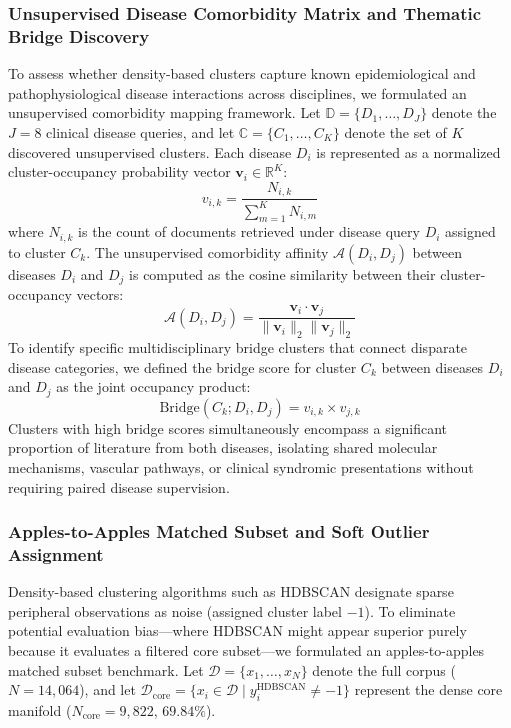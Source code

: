 \documentclass[a4paper,fleqn]{cas-dc}
\begin{document}
\subsubsection{Unsupervised Disease Comorbidity Matrix and Thematic Bridge Discovery}

To assess whether density-based clusters capture known epidemiological and pathophysiological disease interactions across disciplines, we formulated an unsupervised comorbidity mapping framework. Let $\mathbb{D} = \{D_1, \dots, D_J\}$ denote the $J=8$ clinical disease queries, and let $\mathbb{C} = \{C_1, \dots, C_K\}$ denote the set of $K$ discovered unsupervised clusters. Each disease $D_i$ is represented as a normalized cluster-occupancy probability vector $\mathbf{v}_i \in \mathbb{R}^K$:
\begin{equation}
v_{i,k} = \frac{N_{i,k}}{\sum_{m=1}^K N_{i,m}}
\end{equation}
where $N_{i,k}$ is the count of documents retrieved under disease query $D_i$ assigned to cluster $C_k$. The unsupervised comorbidity affinity $\mathcal{A}(D_i, D_j)$ between diseases $D_i$ and $D_j$ is computed as the cosine similarity between their cluster-occupancy vectors:
\begin{equation}
\mathcal{A}(D_i, D_j) = \frac{\mathbf{v}_i \cdot \mathbf{v}_j}{\|\mathbf{v}_i\|_2 \|\mathbf{v}_j\|_2}
\end{equation}
To identify specific multidisciplinary bridge clusters that connect disparate disease categories, we defined the bridge score for cluster $C_k$ between diseases $D_i$ and $D_j$ as the joint occupancy product:
\begin{equation}
\text{Bridge}(C_k; D_i, D_j) = v_{i,k} \times v_{j,k}
\end{equation}
Clusters with high bridge scores simultaneously encompass a significant proportion of literature from both diseases, isolating shared molecular mechanisms, vascular pathways, or clinical syndromic presentations without requiring paired disease supervision.

\subsubsection{Apples-to-Apples Matched Subset and Soft Outlier Assignment}

Density-based clustering algorithms such as HDBSCAN designate sparse peripheral observations as noise (assigned cluster label $-1$). To eliminate potential evaluation bias—where HDBSCAN might appear superior purely because it evaluates a filtered core subset—we formulated an apples-to-apples matched subset benchmark. Let $\mathcal{D} = \{x_1, \dots, x_N\}$ denote the full corpus ($N=14{,}064$), and let $\mathcal{D}_{\text{core}} = \{x_i \in \mathcal{D} \mid y_i^{\text{HDBSCAN}} \neq -1\}$ represent the dense core manifold ($N_{\text{core}} = 9{,}822$, $69.84\%$).
\end{document}
